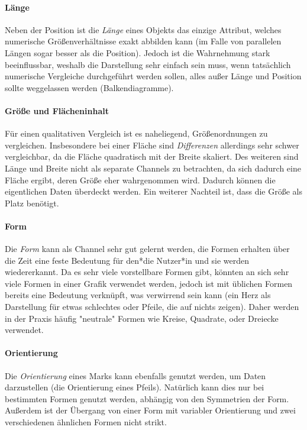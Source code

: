 			\paragraph{Länge}
				Neben der Position ist die \emph{Länge} eines Objekts das einzige Attribut, welches numerische Größenverhältnisse exakt abbilden kann (im Falle von parallelen Längen sogar besser als die Position). Jedoch ist die Wahrnehmung stark beeinflussbar, weshalb die Darstellung sehr einfach sein muss, wenn tatsächlich numerische Vergleiche durchgeführt werden sollen, \dh alles außer Länge und Position sollte weggelassen werden (Balkendiagramme).

			\paragraph{Größe und Flächeninhalt}
				Für einen qualitativen Vergleich ist es naheliegend, Größenordnungen zu vergleichen. Insbesondere bei einer Fläche sind \emph{Differenzen} allerdings sehr schwer vergleichbar, da die Fläche quadratisch mit der Breite skaliert. Des weiteren sind Länge und Breite nicht als separate Channels zu betrachten, da sich dadurch eine Fläche ergibt, deren Größe eher wahrgenommen wird. Dadurch können die eigentlichen Daten überdeckt werden. Ein weiterer Nachteil ist, dass die Größe als Platz benötigt.

			\paragraph{Form}
				Die \emph{Form} kann als Channel sehr gut gelernt werden, \dh die Formen erhalten über die Zeit eine feste Bedeutung für den*die Nutzer*in und sie werden wiedererkannt. Da es sehr viele vorstellbare Formen gibt, könnten an sich sehr viele Formen in einer Grafik verwendet werden, jedoch ist mit üblichen Formen bereits eine Bedeutung verknüpft, was verwirrend sein kann (\bspw ein Herz als Darstellung für etwas schlechtes oder Pfeile, die auf nichts zeigen). Daher werden in der Praxis häufig "neutrale" Formen wie Kreise, Quadrate, oder Dreiecke verwendet.

			\paragraph{Orientierung}
				Die \emph{Orientierung} eines Marks kann ebenfalls genutzt werden, um Daten darzustellen (\bspw die Orientierung eines Pfeils). Natürlich kann dies nur bei bestimmten Formen genutzt werden, abhängig von den Symmetrien der Form. Außerdem ist der Übergang von einer Form mit variabler Orientierung und zwei verschiedenen ähnlichen Formen nicht strikt.

